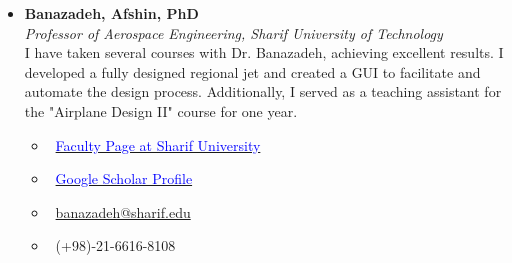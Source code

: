 \documentclass[12pt]{article}
\begin{document}
{}
{
\begin{itemize}
	\item \textbf{Banazadeh, Afshin, PhD} \vspace{1pt}\\
	\textit{Professor of Aerospace Engineering, Sharif University of Technology}
	 \vspace{2pt}\\
I have taken several courses with Dr. Banazadeh, achieving excellent results. I developed a fully designed regional jet and created a GUI to facilitate and automate the design process. Additionally, I served as a teaching assistant for the "Airplane Design II" course for one year.

	\begin{multicols}{2}
		\begin{itemize}
			\item \faGlobe \ \href{http://ae.sharif.edu/~portal/faculty/1014037799}{\textcolor{blue}{Faculty Page at Sharif University}}
			\item \faGraduationCap \ \href{https://scholar.google.com/citations?user=8Z6xyyUAAAAJ&hl=en}{\textcolor{blue}{Google Scholar Profile}}
			\item \faEnvelope \ \href{mailto:banazadeh@sharif.edu}{banazadeh@sharif.edu}
			\item \faPhone \ (+98)-21-6616-8108
		\end{itemize}
\end{multicols}
\end{itemize}
}









\end{document}
